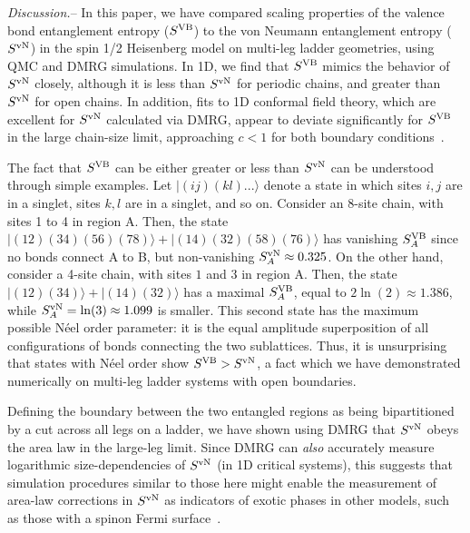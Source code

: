 \documentclass[prl,aps,twocolumn,floatfix,amsmath,amssymb,superscriptaddress,tightenlines]{revtex4}
\begin{document}
{\it Discussion.}-- In this paper, we have compared scaling properties of
the valence bond entanglement entropy ($S^{\rm VB}$) \cite{Alet,Chh} to the von Neumann entanglement entropy ($S^{ \rm vN}$) in the
spin 1/2 Heisenberg model on multi-leg ladder geometries, using QMC and DMRG simulations.
In 1D, we find
that $S^{\rm VB}$ mimics the behavior of $S^{ \rm vN}$ closely, although 
it is less than $S^{ \rm vN}$ for periodic
chains, and greater than $S^{ \rm vN}$ for open chains. In addition, fits to
1D conformal field theory, which are excellent for $S^{ \rm vN}$ calculated
via DMRG, appear to deviate significantly for $S^{\rm VB}$ in the large
chain-size limit, approaching $c<1$ for both boundary conditions~\cite{XXX}.

The fact  that $S^{\rm VB}$ can be either greater or less than $S^{ \rm
vN}$ can be understood through simple examples. Let $|(ij)(kl)...\rangle$
denote a state in which sites $i,j$ are in a singlet, sites $k,l$ are in a
singlet, and so on.  Consider an 8-site chain, with sites 1 to 4 in region
A. Then, the state $|(12)(34)(56)(78)\rangle+|(14)(32)(58)(76)\rangle$ has
vanishing $S^{\rm VB}_A$ since no bonds connect A to B, but
non-vanishing $S^{ \rm vN}_A \approx 0.325$.  On the other hand, consider a 4-site chain,
with sites $1$ and $3$ in region A. Then, the state
$|(12)(34)\rangle+|(14)(32)\rangle$ has a maximal $S^{\rm VB}_A$, equal to
$2\ln(2) \approx 1.386$, while $S^{ \rm vN}_A = \ln(3) \approx 1.099$ is smaller.  This second state
has the maximum possible N\'eel order parameter: it is the
equal amplitude superposition of all configurations of bonds connecting the
two sublattices.
Thus, it is unsurprising that states with N\'eel order show $S^{\rm VB} > S^{ \rm vN}$,
a fact which we have demonstrated numerically on multi-leg ladder systems with open boundaries.


Defining the boundary between the two entangled regions as being bipartitioned by a cut across all legs
on a ladder, we have shown using DMRG that $S^{ \rm vN}$ obeys the area law in the large-leg limit.   
Since DMRG can {\it also} accurately measure logarithmic size-dependencies of $S^{\rm vN}$ (in 1D critical systems), this suggests that simulation procedures similar to those here might enable the measurement of area-law corrections in $S^{\rm vN}$ as indicators of exotic phases in other models, such as those with
a spinon Fermi surface~\cite{BoseMetal}.
\end{document}
